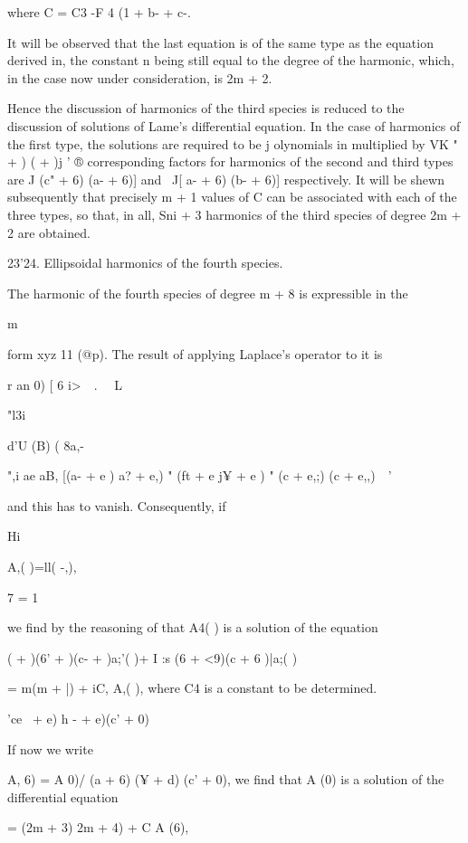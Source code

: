 {where C = C3 -F 4 (1 + b- + c-.

It will be observed that the last equation is of the same type as the
equation derived in, the constant n being still equal to the
degree of the harmonic, which, in the case now under consideration, is
2m + 2.

Hence the discussion of harmonics of the third species is reduced to
the discussion of solutions of Lame's differential equation. In the
case of harmonics of the first type, the solutions are required to be
j olynomials in multiplied by VK " + ) ( + )j ' ® corresponding
factors for harmonics of the second and third types are J (c" + 6) (a-
+ 6)] and \ J[ a- + 6) (b- + 6)] respectively. It will be shewn
subsequently that precisely m + 1 values of C can be associated with
each of the three types, so that, in all, Sni + 3 harmonics of the
third species of degree 2m + 2 are obtained.

23'24. Ellipsoidal harmonics of the fourth species.

The harmonic of the fourth species of degree m + 8 is expressible in
the

m

form xyz 11 (@p). The result of applying Laplace's operator to it is

r an 0) [ 6 i>\ \ . \ \ L

"l3i %

  d'U (B) ( 8a,- \ %

",i ae aB, [(a- + e ) a? + e,) " (ft + e j¥ + e ) " (c + e,;) (c +
e,,)\ \ '

and this has to vanish. Consequently, if

Hi

A,( )=ll( -,),

7 = 1

we find by the reasoning of that A4( ) is a solution of the
equation

( + )(6' + )(c- + )a;'( )+ I :s (6 + <9)(c + 6 )|a;( )

= m(m + |) + iC, A,( ), where C4 is a constant to be determined.

 'ce~ + e) h - + e)(c' + 0) ~

%
%

If now we write

A, 6) = A 0)/ (a + 6) (¥ + d) (c' + 0), we find that A (0) is a
solution of the differential equation

= (2m + 3) 2m + 4) + C A (6),

}
